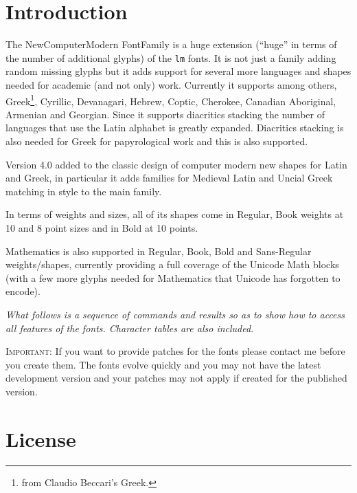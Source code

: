 \documentclass{article}
\begin{document}
\newsavebox{\vsbox}



\section{Introduction}
The NewComputerModern FontFamily is a huge extension (``huge'' in terms of
the number of additional glyphs)
of the \verb|lm| fonts. It is not just a family adding random missing glyphs but it
adds support for several more languages and shapes needed for academic (and not only) work.
Currently it supports among others, Greek\footnote{from Claudio Beccari's Greek.},
Cyrillic,
Devanagari, Hebrew, Coptic, Cherokee,
Canadian Aboriginal, Armenian and Georgian. Since it supports
diacritics stacking the number of languages that use the Latin alphabet is greatly expanded. 
Diacritics stacking is also needed for Greek for papyrological work and this is also supported.

Version 4.0 added to the classic design of computer modern new shapes for Latin and Greek,
in particular it adds families for Medieval Latin and Uncial Greek matching in style to the
main family.

In terms of weights and sizes, all of its shapes come in Regular, Book weights
at 10 and 8 point sizes and in Bold at 10 points.

Mathematics is also supported in Regular, Book, Bold and Sans-Regular weights/shapes,
currently providing
a full coverage of the Unicode Math blocks (with a few more glyphs needed for Mathematics
that Unicode has forgotten to encode).

\textit{What follows is a sequence of commands and results so as to show how to access all features
of the fonts. Character tables are also included}.

\textsc{Important:} If you want to provide patches for the fonts
please contact me before you create them. The fonts evolve quickly
and you may not have the latest development version and your patches
may not apply if created for the published version.

\section{License}
\end{document}
